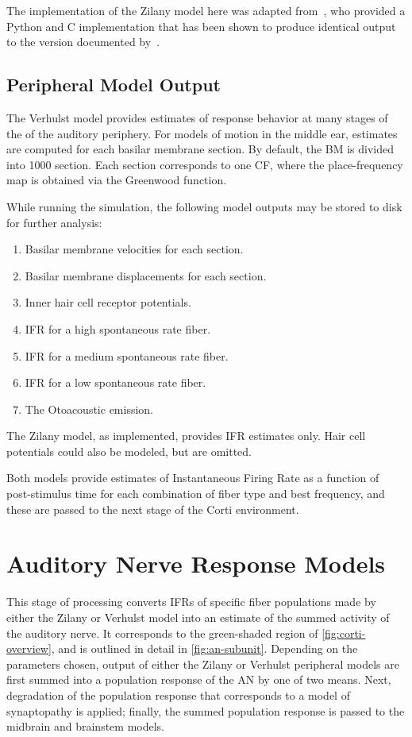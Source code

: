 The implementation of the Zilany model here was adapted from~\cite{Rudnicki2014Cochlea}, who provided a Python and C implementation that has been shown to produce identical output to the version documented by~\cite{Zilany2014Updated}.



\subsection{Peripheral Model Output} %
\label{sub:peripheral_model_output}
The Verhulst model provides estimates of response behavior at many stages of the of the auditory periphery.   For models of motion in the middle ear, estimates are computed for each basilar membrane section.  By default, the BM is divided into 1000 section.  Each section corresponds to one CF, where the place-frequency map is obtained via the Greenwood function.

 While running the simulation, the following model outputs may be stored to disk for further analysis: 
\begin{enumerate}
	\item Basilar membrane velocities for each section.
	\item Basilar membrane displacements for each section.
	\item Inner hair cell receptor potentials. 
	\item IFR for a high spontaneous rate fiber.
	\item IFR for a medium spontaneous rate fiber.
	\item IFR for a low spontaneous rate fiber. 
	\item The Otoacoustic emission. 
\end{enumerate}

The Zilany model, as implemented, provides IFR estimates only.  Hair cell potentials could also be modeled, but are omitted.

Both models provide estimates of Instantaneous Firing Rate as a function of post-stimulus time for each combination of fiber type and best frequency, and these are passed to the next stage of the Corti environment.


\section{Auditory Nerve Response Models} %
\label{sec:auditory_nerve_response_models}
This stage of processing converts IFRs of specific fiber populations made by either the Zilany or Verhulst model into an estimate of the summed activity of the auditory nerve. It corresponds to the green-shaded region of \autoref{fig:corti-overview}, and is outlined in detail in \autoref{fig:an-subunit}.  Depending on the parameters chosen, output of either the Zilany or Verhulst peripheral models are first summed into a population response of the AN by one of two means.  Next, degradation of the population response that corresponds to a model of synaptopathy is applied; finally, the summed population response is passed to the midbrain and brainstem models.

